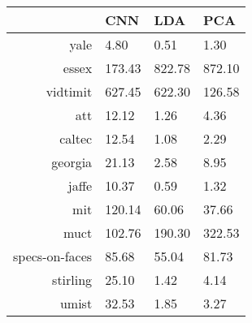 \begin{tabular}{|r|l|l|l|}
  \hline
    & CNN & LDA & PCA \\
  \hline
  yale & 4.80 & 0.51 & 1.30 \\
  \hline
  essex & 173.43 & 822.78 & 872.10 \\
  \hline
  vidtimit & 627.45 & 622.30 & 126.58 \\
  \hline
  att & 12.12 & 1.26 & 4.36 \\
  \hline
  caltec & 12.54 & 1.08 & 2.29 \\
  \hline
  georgia & 21.13 & 2.58 & 8.95 \\
  \hline
  jaffe & 10.37 & 0.59 & 1.32 \\
  \hline
  mit & 120.14 & 60.06 & 37.66 \\
  \hline
  muct & 102.76 & 190.30 & 322.53 \\
  \hline
  specs-on-faces & 85.68 & 55.04 & 81.73 \\
  \hline
  stirling & 25.10 & 1.42 & 4.14 \\
  \hline
  umist & 32.53 & 1.85 & 3.27 \\
  \hline
\end{tabular}

